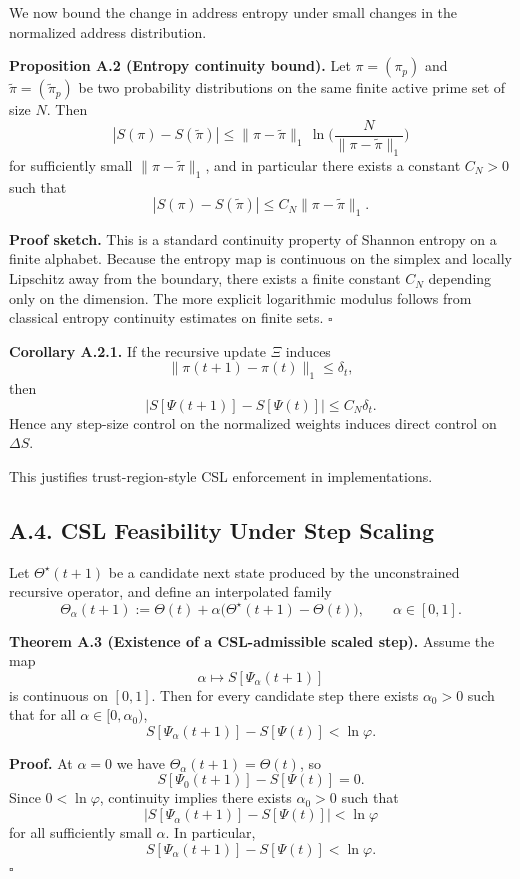 \documentclass[11pt]{article}
\begin{document}
We now bound the change in address entropy under small changes in the normalized address distribution.

\textbf{Proposition A.2 (Entropy continuity bound).}
Let $\pi=(\pi_p)$ and $\tilde{\pi}=(\tilde{\pi}_p)$ be two probability distributions on the same finite active prime set of size $N$. Then
\[
|S(\pi)-S(\tilde{\pi})|
\le
\|\pi-\tilde{\pi}\|_1 \,\ln\!\Big(\frac{N}{\|\pi-\tilde{\pi}\|_1}\Big)
\]
for sufficiently small $\|\pi-\tilde{\pi}\|_1$, and in particular there exists a constant $C_N>0$ such that
\[
|S(\pi)-S(\tilde{\pi})|
\le
C_N \|\pi-\tilde{\pi}\|_1.
\]

\textbf{Proof sketch.}
This is a standard continuity property of Shannon entropy on a finite alphabet. Because the entropy map is continuous on the simplex and locally Lipschitz away from the boundary, there exists a finite constant $C_N$ depending only on the dimension. The more explicit logarithmic modulus follows from classical entropy continuity estimates on finite sets. \hfill $\square$

\textbf{Corollary A.2.1.}
If the recursive update $\Xi$ induces
\[
\|\pi(t+1)-\pi(t)\|_1 \le \delta_t,
\]
then
\[
|S[\Psi(t+1)]-S[\Psi(t)]|
\le
C_N \delta_t.
\]
Hence any step-size control on the normalized weights induces direct control on $\Delta S$.

This justifies trust-region-style CSL enforcement in implementations. \cite{EntropyNeuralControl,StabilityRegions}

\subsection*{A.4. CSL Feasibility Under Step Scaling}

Let $\Theta^\star(t+1)$ be a candidate next state produced by the unconstrained recursive operator, and define an interpolated family
\[
\Theta_\alpha(t+1) := \Theta(t) + \alpha\big(\Theta^\star(t+1)-\Theta(t)\big),
\qquad \alpha\in[0,1].
\]

\textbf{Theorem A.3 (Existence of a CSL-admissible scaled step).}
Assume the map
\[
\alpha \mapsto S[\Psi_\alpha(t+1)]
\]
is continuous on $[0,1]$. Then for every candidate step there exists $\alpha_0>0$ such that for all $\alpha\in[0,\alpha_0)$,
\[
S[\Psi_\alpha(t+1)] - S[\Psi(t)] < \ln \varphi.
\]

\textbf{Proof.}
At $\alpha=0$ we have $\Theta_\alpha(t+1)=\Theta(t)$, so
\[
S[\Psi_0(t+1)] - S[\Psi(t)] = 0.
\]
Since $0<\ln\varphi$, continuity implies there exists $\alpha_0>0$ such that
\[
|S[\Psi_\alpha(t+1)]-S[\Psi(t)]| < \ln\varphi
\]
for all sufficiently small $\alpha$. In particular,
\[
S[\Psi_\alpha(t+1)] - S[\Psi(t)] < \ln\varphi.
\]
\hfill $\square$
\end{document}

